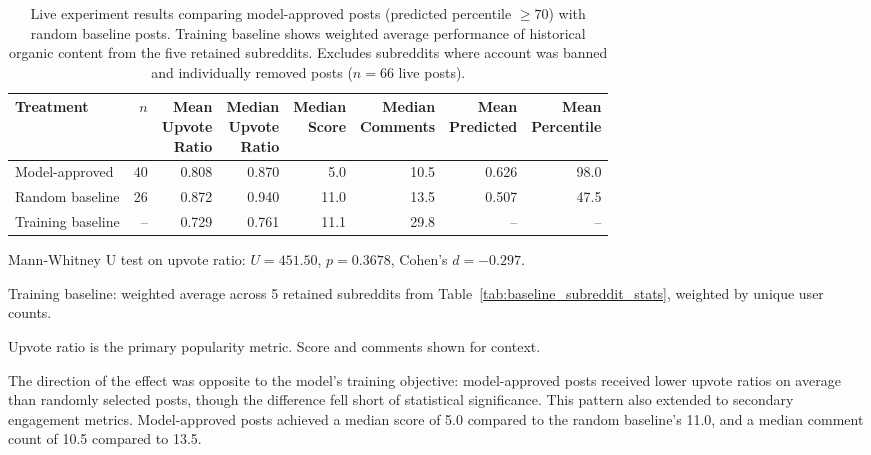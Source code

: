 \begin{table}[htbp]
\centering
\caption{Live experiment results comparing model-approved posts (predicted percentile $\geq 70$) with random baseline posts. Training baseline shows weighted average performance of historical organic content from the five retained subreddits. Excludes subreddits where account was banned and individually removed posts ($n=66$ live posts).}
\label{tab:treatment_comparison}
\begin{threeparttable}
\begin{tabular}{lrrrrrrr}
\toprule
Treatment & $n$ & \makecell{Mean\\Upvote\\Ratio} & \makecell{Median\\Upvote\\Ratio} & \makecell{Median\\Score} & \makecell{Median\\Comments} & \makecell{Mean\\Predicted} & \makecell{Mean\\Percentile} \\
\midrule
Model-approved & 40 & 0.808 & 0.870 & 5.0 & 10.5 & 0.626 & 98.0 \\
Random baseline & 26 & 0.872 & 0.940 & 11.0 & 13.5 & 0.507 & 47.5 \\
\midrule
Training baseline & -- & 0.729 & 0.761 & 11.1 & 29.8 & -- & -- \\
\bottomrule
\end{tabular}
\vspace{0.2cm}
\begin{tablenotes}
\small
\item Mann-Whitney U test on upvote ratio: $U=451.50$, $p=0.3678$, Cohen's $d=-0.297$.
\item Training baseline: weighted average across 5 retained subreddits from Table~\ref{tab:baseline_subreddit_stats}, weighted by unique user counts.
\item Upvote ratio is the primary popularity metric. Score and comments shown for context.
\end{tablenotes}
\end{threeparttable}
\end{table}

The direction of the effect was opposite to the model's training objective: model-approved posts received lower upvote ratios on average than randomly selected posts, though the difference fell short of statistical significance. This pattern also extended to secondary engagement metrics. Model-approved posts achieved a median score of 5.0 compared to the random baseline's 11.0, and a median comment count of 10.5 compared to 13.5.

